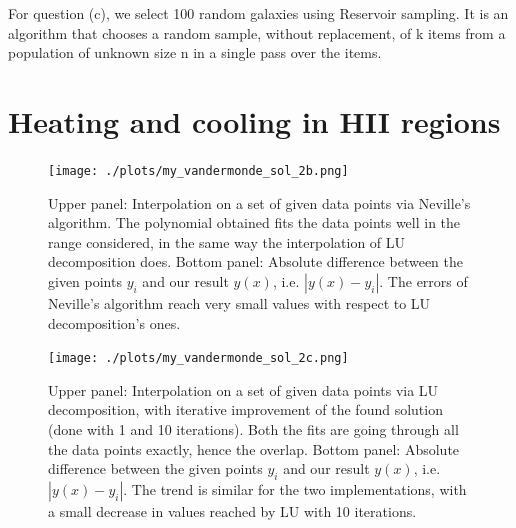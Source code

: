 For question (c), we select 100 random galaxies using Reservoir sampling. It is an algorithm that chooses a random sample, without replacement, of k items from a population of unknown size n in a single pass over the items. 


\section{Heating and cooling in HII regions}

\begin{figure}[h!]
  \centering
  \texttt{[image: ./plots/my\_vandermonde\_sol\_2b.png]}
  \caption{Upper panel: Interpolation on a set of given data points via Neville's algorithm. The polynomial obtained fits the data points well in the range considered, in the same way the interpolation of LU decomposition does. Bottom panel: Absolute difference between the given points $y_i$ and our result $y(x)$, i.e. $|y(x) - y_{i}|$. The errors of Neville's algorithm reach very small values with respect to LU decomposition's ones. }
  \label{fig:neville}
\end{figure}

\begin{figure}[h!]
  \centering
  \texttt{[image: ./plots/my\_vandermonde\_sol\_2c.png]}
  \caption{Upper panel: Interpolation on a set of given data points via LU decomposition, with iterative improvement of the found solution (done with 1 and 10 iterations). Both the fits are going through all the data points exactly, hence the overlap. Bottom panel: Absolute difference between the given points $y_i$ and our result $y(x)$, i.e. $|y(x) - y_{i}|$. The trend is similar for the two implementations, with a small decrease in values reached by LU with 10 iterations.}
  \label{fig:lu_iter}
\end{figure}
